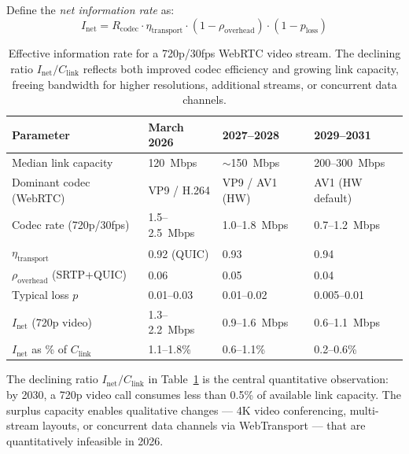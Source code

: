 Define the \emph{net information rate} as:
\begin{equation}
  I_{\text{net}} = R_{\text{codec}} \cdot \eta_{\text{transport}}
    \cdot (1 - \rho_{\text{overhead}})
    \cdot (1 - p_{\text{loss}})
  \label{eq:inet}
\end{equation}

\begin{table}[ht]
\centering
\small
\renewcommand{\arraystretch}{1.4}
\begin{tabularx}{\textwidth}{lXXX}
\toprule
\textbf{Parameter} & \textbf{March 2026} & \textbf{2027--2028} &
  \textbf{2029--2031} \\
\midrule
Median link capacity &
  120~Mbps &
  $\sim$150~Mbps &
  200--300~Mbps \\
Dominant codec (WebRTC) &
  VP9 / H.264 &
  VP9 / AV1 (HW) &
  AV1 (HW default) \\
Codec rate (720p/30fps) &
  1.5--2.5~Mbps &
  1.0--1.8~Mbps &
  0.7--1.2~Mbps \\
$\eta_{\text{transport}}$ &
  0.92 (QUIC) &
  0.93 &
  0.94 \\
$\rho_{\text{overhead}}$ (SRTP+QUIC) &
  0.06 &
  0.05 &
  0.04 \\
Typical loss $p$ &
  0.01--0.03 &
  0.01--0.02 &
  0.005--0.01 \\
$I_{\text{net}}$ (720p video) &
  1.3--2.2~Mbps &
  0.9--1.6~Mbps &
  0.6--1.1~Mbps \\
$I_{\text{net}}$ as \% of $C_{\text{link}}$ &
  1.1--1.8\% &
  0.6--1.1\% &
  0.2--0.6\% \\
\bottomrule
\end{tabularx}
\caption{Effective information rate for a 720p/30fps WebRTC video stream.
  The declining ratio $I_{\text{net}} / C_{\text{link}}$ reflects both
  improved codec efficiency and growing link capacity, freeing bandwidth
  for higher resolutions, additional streams, or concurrent data
  channels.}
\label{tab:inet}
\end{table}

The declining ratio $I_{\text{net}} / C_{\text{link}}$ in
Table~\ref{tab:inet} is the central quantitative observation: by 2030, a
720p video call consumes less than 0.5\% of available link capacity. The
surplus capacity enables qualitative changes --- 4K video conferencing,
multi-stream layouts, or concurrent data channels via WebTransport ---
that are quantitatively infeasible in 2026.


